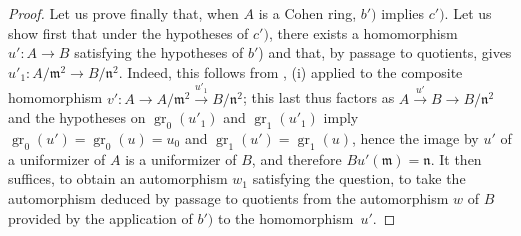 \begin{proof}
Let us prove finally that, when $A$ is a Cohen ring, $b')$ implies $c')$.
Let us show first that under the hypotheses of $c')$, there exists a homomorphism $u':A\to B$ satisfying the hypotheses of $b'$) and that, by passage to quotients, gives $u'_1:A/\mathfrak{m}^2\to B/\mathfrak{n}^2$.
Indeed, this follows from , (i) applied to the composite homomorphism $v':A\to A/\mathfrak{m}^2\xrightarrow{u'_1} B/\mathfrak{n}^2$;
this last thus factors as $A\xrightarrow{u'} B\to B/\mathfrak{n}^2$ and the hypotheses on $\operatorname{gr}_0(u'_1)$ and $\operatorname{gr}_1(u'_1)$ imply $\operatorname{gr}_0(u')=\operatorname{gr}_0(u)=u_0$ and $\operatorname{gr}_1(u')=\operatorname{gr}_1(u)$, hence the image by $u'$ of a uniformizer of $A$ is a uniformizer of $B$, and therefore $Bu'(\mathfrak{m})=\mathfrak{n}$.
It then suffices, to obtain an automorphism $w_1$ satisfying the question, to take the automorphism deduced by passage to quotients from the automorphism $w$ of $B$ provided by the application of $b')$ to the homomorphism~$u'$.
\end{proof}

